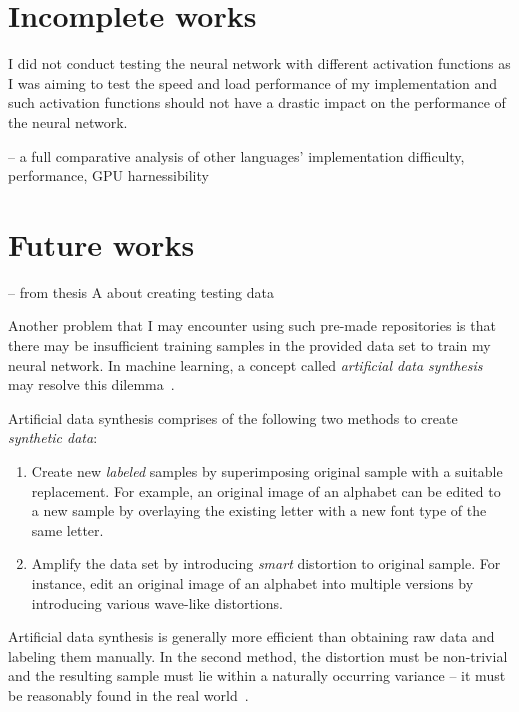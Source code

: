 \section{Incomplete works} \label{se:eval.incomplete}

I did not conduct testing the neural network with different activation functions as I was aiming to test the speed and load performance of my implementation and such activation functions should not have a drastic impact on the performance of the neural network.

-- a full comparative analysis of other languages' implementation difficulty, performance, GPU harnessibility

\section{Future works} \label{se:eval.future}



-- from thesis A about creating testing data

Another problem that I may encounter using such pre-made repositories is that there may be insufficient training samples in the provided data set to train my neural network. In machine learning, a concept called \textit{artificial data synthesis} may resolve this dilemma~\cite{Ng12}. 

Artificial data synthesis comprises of the following two methods to create \textit{synthetic data}: 
\begin{enumerate}
\item Create new \textit{labeled} samples by superimposing original sample with a suitable replacement. For example, an original image of an alphabet can be edited to a new sample by overlaying the existing letter with a new font type of the same letter.
\item Amplify the data set by introducing \textit{smart} distortion to original sample. For instance, edit an original image of an alphabet into multiple versions by introducing various wave-like distortions.
\end{enumerate}

Artificial data synthesis is generally more efficient than obtaining raw data and labeling them manually. In the second method, the distortion must be non-trivial and the resulting sample must lie within a naturally occurring variance -- it must be reasonably found in the real world~\cite{Ng12}.

